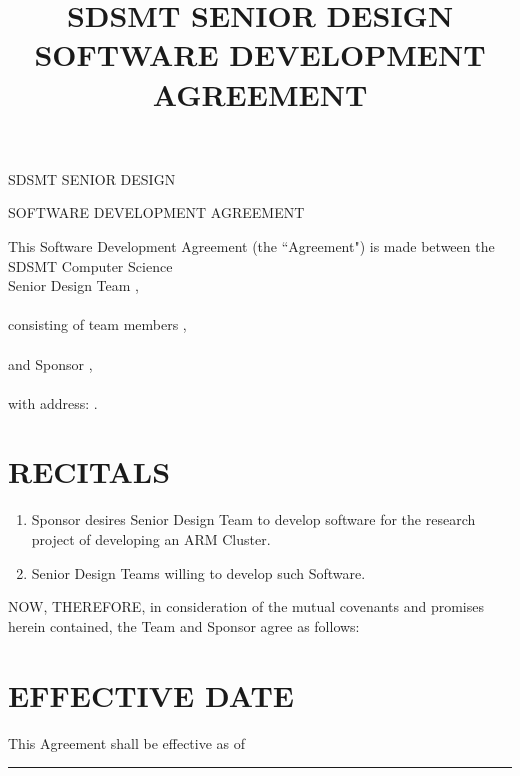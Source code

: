 \documentclass[11pt]{article}
\title{SDSMT SENIOR DESIGN SOFTWARE DEVELOPMENT AGREEMENT}
\begin{document}


{\Large \bf 
\centerline{SDSMT SENIOR DESIGN}\centerline{SOFTWARE DEVELOPMENT AGREEMENT}
}
\vspace{\baselineskip}

This Software Development Agreement (the ``Agreement") is made between the SDSMT  Computer Science\\[3mm] Senior Design Team  \hrulefill, \\[-1mm]  \hspace*{9cm} {\footnotesize}\\[3mm]
consisting of team members  \hrulefill,  \\[-1mm]  \hspace*{9cm} {\footnotesize }\\[3mm]
 and  Sponsor \hrulefill,  \\[-1mm]  \hspace*{9cm}{\footnotesize} \\[3mm]
 with address: \hrulefill . 


\section{RECITALS}
\begin{enumerate}  \itemsep4pt \parskip0pt 
\item Sponsor desires Senior Design Team to develop software for the research project of developing an ARM Cluster.

\item Senior Design Teams willing to develop such Software.  
\end{enumerate}
NOW, THEREFORE, in consideration of the mutual covenants and promises herein contained, the Team and Sponsor agree as follows:  

\section{EFFECTIVE DATE }

This Agreement shall be effective as of \rule{4cm}{0.4pt}  
\end{document}
